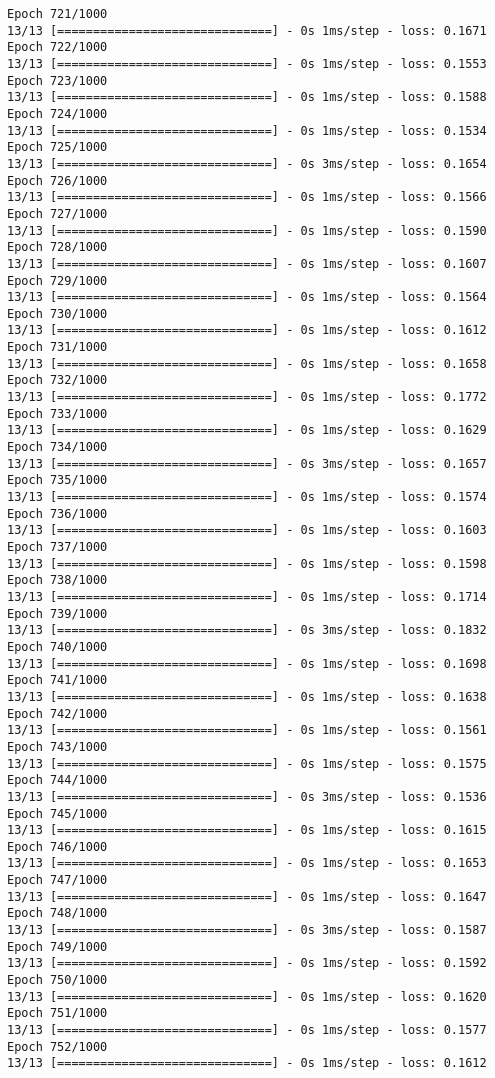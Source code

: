 \documentclass[11pt]{article}
\begin{document}
\begin{Verbatim}[commandchars=\\\{\}]
Epoch 721/1000
13/13 [==============================] - 0s 1ms/step - loss: 0.1671
Epoch 722/1000
13/13 [==============================] - 0s 1ms/step - loss: 0.1553
Epoch 723/1000
13/13 [==============================] - 0s 1ms/step - loss: 0.1588
Epoch 724/1000
13/13 [==============================] - 0s 1ms/step - loss: 0.1534
Epoch 725/1000
13/13 [==============================] - 0s 3ms/step - loss: 0.1654
Epoch 726/1000
13/13 [==============================] - 0s 1ms/step - loss: 0.1566
Epoch 727/1000
13/13 [==============================] - 0s 1ms/step - loss: 0.1590
Epoch 728/1000
13/13 [==============================] - 0s 1ms/step - loss: 0.1607
Epoch 729/1000
13/13 [==============================] - 0s 1ms/step - loss: 0.1564
Epoch 730/1000
13/13 [==============================] - 0s 1ms/step - loss: 0.1612
Epoch 731/1000
13/13 [==============================] - 0s 1ms/step - loss: 0.1658
Epoch 732/1000
13/13 [==============================] - 0s 1ms/step - loss: 0.1772
Epoch 733/1000
13/13 [==============================] - 0s 1ms/step - loss: 0.1629
Epoch 734/1000
13/13 [==============================] - 0s 3ms/step - loss: 0.1657
Epoch 735/1000
13/13 [==============================] - 0s 1ms/step - loss: 0.1574
Epoch 736/1000
13/13 [==============================] - 0s 1ms/step - loss: 0.1603
Epoch 737/1000
13/13 [==============================] - 0s 1ms/step - loss: 0.1598
Epoch 738/1000
13/13 [==============================] - 0s 1ms/step - loss: 0.1714
Epoch 739/1000
13/13 [==============================] - 0s 3ms/step - loss: 0.1832
Epoch 740/1000
13/13 [==============================] - 0s 1ms/step - loss: 0.1698
Epoch 741/1000
13/13 [==============================] - 0s 1ms/step - loss: 0.1638
Epoch 742/1000
13/13 [==============================] - 0s 1ms/step - loss: 0.1561
Epoch 743/1000
13/13 [==============================] - 0s 1ms/step - loss: 0.1575
Epoch 744/1000
13/13 [==============================] - 0s 3ms/step - loss: 0.1536
Epoch 745/1000
13/13 [==============================] - 0s 1ms/step - loss: 0.1615
Epoch 746/1000
13/13 [==============================] - 0s 1ms/step - loss: 0.1653
Epoch 747/1000
13/13 [==============================] - 0s 1ms/step - loss: 0.1647
Epoch 748/1000
13/13 [==============================] - 0s 3ms/step - loss: 0.1587
Epoch 749/1000
13/13 [==============================] - 0s 1ms/step - loss: 0.1592
Epoch 750/1000
13/13 [==============================] - 0s 1ms/step - loss: 0.1620
Epoch 751/1000
13/13 [==============================] - 0s 1ms/step - loss: 0.1577
Epoch 752/1000
13/13 [==============================] - 0s 1ms/step - loss: 0.1612

\end{Verbatim}
\end{document}
